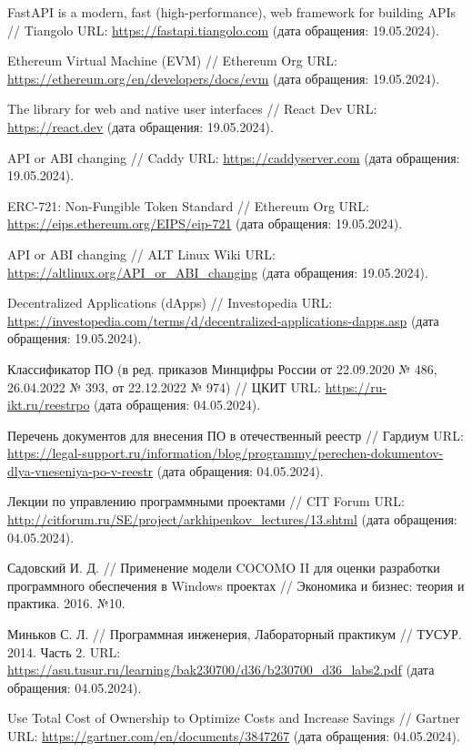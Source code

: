 \begin{thebibliography}{99\kern\bibindent}
	 FastAPI is a modern, fast (high-performance), web framework for building APIs // Tiangolo URL: \url{https://fastapi.tiangolo.com} (дата обращения: 19.05.2024).

	 Ethereum Virtual Machine (EVM) // Ethereum Org URL: \url{https://ethereum.org/en/developers/docs/evm} (дата обращения: 19.05.2024).

	 The library for web and native user interfaces // React Dev URL: \url{https://react.dev} (дата обращения: 19.05.2024).

	 API or ABI changing // Caddy URL: \url{https://caddyserver.com} (дата обращения: 19.05.2024).

	 ERC-721: Non-Fungible Token Standard // Ethereum Org URL: \url{https://eips.ethereum.org/EIPS/eip-721} (дата обращения: 19.05.2024).

	 API or ABI changing // ALT Linux Wiki URL: \url{https://altlinux.org/API_or_ABI_changing} (дата обращения: 19.05.2024).

	 Decentralized Applications (dApps) // Investopedia URL: \url{https://investopedia.com/terms/d/decentralized-applications-dapps.asp} (дата обращения: 19.05.2024).

	 Классификатор ПО (в ред. приказов Минцифры России от 22.09.2020 № 486, 26.04.2022 № 393, от 22.12.2022 № 974) // ЦКИТ URL: \url{https://ru-ikt.ru/reestrpo} (дата обращения: 04.05.2024).

	 Перечень документов для внесения ПО в отечественный реестр // Гардиум URL: \url{https://legal-support.ru/information/blog/programmy/perechen-dokumentov-dlya-vneseniya-po-v-reestr} (дата обращения: 04.05.2024).

	 Лекции по управлению программными проектами // CIT Forum URL: \url{http://citforum.ru/SE/project/arkhipenkov_lectures/13.shtml} (дата обращения: 04.05.2024).

	 Садовский И. Д. // Применение модели COCOMO II для оценки разработки программного обеспечения в Windows проектах // Экономика и бизнес: теория и практика. 2016. №10. %

	 Миньков С. Л. // Программная инженерия, Лабораторный практикум // ТУСУР. 2014. Часть 2. URL: \url{https://asu.tusur.ru/learning/bak230700/d36/b230700_d36_labs2.pdf} (дата обращения: 04.05.2024).

	 Use Total Cost of Ownership to Optimize Costs and Increase Savings // Gartner URL: \url{https://gartner.com/en/documents/3847267} (дата обращения: 04.05.2024).
\end{thebibliography}